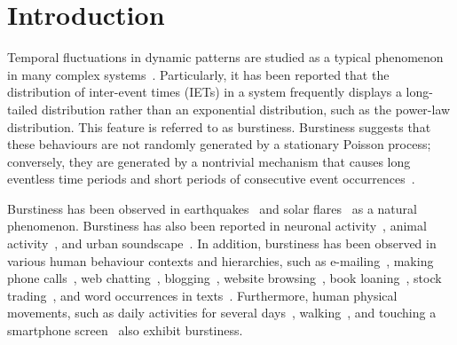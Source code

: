 \documentclass{bmcart}
\begin{document}
\section{Introduction}
\label{sec:1}
Temporal ﬂuctuations in dynamic patterns are studied as a typical phenomenon in many complex systems~\cite{karsai2018bursty}. Particularly, it has been reported that the distribution of inter-event times (IETs) in a system frequently displays a long-tailed distribution rather than an exponential distribution, such as the power-law distribution. This feature is referred to as burstiness. Burstiness suggests that these behaviours are not randomly generated by a stationary Poisson process; conversely, they are generated by a nontrivial mechanism that causes long eventless time periods and short periods of consecutive event occurrences~\cite{Barabasi2005}.


Burstiness has been observed in earthquakes~\cite{PhysRevLett.92.108501} and solar flares~\cite{ROSS2020124775} as a natural phenomenon. Burstiness has also been reported in neuronal activity~\cite{10.1162/089976603322518759}, animal activity~\cite{REYNOLDS2011245}, and urban soundscape~\cite{DESOUSA2019121557}. In addition, burstiness has been observed in various human behaviour contexts and hierarchies, such as e-mailing~\cite{Barabasi2005,PhysRevE.73.036127}, making phone calls~\cite{PhysRevE.83.025102}, web chatting~\cite{ZHANG2020122854}, blogging~\cite{YAN2017775}, website browsing~\cite{PhysRevE.73.036127}, book loaning~\cite{PhysRevE.73.036127,LEE2021125473},  stock trading~\cite{PhysRevE.73.036127}, and word occurrences in texts~\cite{CUI2017103}.
Furthermore, human physical movements, such as daily activities for several days~\cite{PhysRevLett.99.138103}, walking~\cite{PICOLI2022127160}, and touching a smartphone screen~\cite{PhysRevE.102.012307} also exhibit burstiness.
\end{document}
